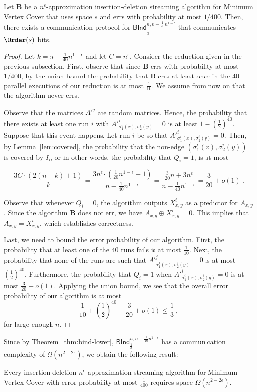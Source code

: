 \begin{theorem} \label{thm:vc-reduction}
 Let $\mathbf{B}$ be a $n^{\epsilon}$-approximation 
 insertion-deletion streaming algorithm for \textsf{Minimum Vertex Cover} that uses space $s$ and errs with probability 
 at most $1/400$. Then, there exists a communication protocol for $\textsf{BInd}^{n,n - \frac{1}{20}n^{1-\epsilon}}_{\frac{1}{3}}$ 
 that communicates $\Order(s)$ bits.
\end{theorem}
\begin{proof}
Let $k = n - \frac{1}{40} n^{1-\epsilon}$ and let $C= n^{\epsilon}$.
 Consider the reduction given in the previous subsection. First, observe that since $\mathbf{B}$ errs with probability
 at most $1/400$, by the union bound the probability that $\mathbf{B}$ errs at least once in the $40$ parallel executions of our
 reduction is at most $\frac{1}{10}$. We assume from now on that the algorithm never errs.
 
 Observe that the matrices $A'^j$ are random matrices. Hence, 
%
%
 the probability that there exists at least one run $i$ with $A'^i_{\sigma^i_1(x), \sigma^i_2(y)} = 0$ is at least 
 $1 - (\frac{1}{2})^{40}$. Suppose that this event happens. Let run $i$ be so that $A'^i_{\sigma^i_1(x), \sigma^i_2(y)} = 0$.
 Then, by Lemma~\ref{lem:covered}, the probability that the non-edge $(\sigma^i_1(x), \sigma^i_2(y))$ is covered by $I_i$,
 or in other words, the probability that $Q_i = 1$, is at most 
 
 $$\frac{3 C \cdot (2(n-k) + 1)}{k} = \frac{3n^{\epsilon} \cdot (\frac{1}{20} n^{1-\epsilon} + 1) }{n - \frac{1}{40}n^{1-\epsilon}} = 
 \frac{\frac{3}{20}n + 3n^{\epsilon}}{n - \frac{1}{40}n^{1-\epsilon}} = \frac{3}{20} + o(1) \ . $$  
 
 Observe that whenever $Q_i = 0$, the algorithm outputs $X^i_{x,y}$ as a predictor for $A_{x,y}$. Since the algorithm $\mathbf{B}$ 
 does not err, we have $A_{x,y} \oplus X^i_{x,y} = 0$. This implies that $A_{x,y} = X^i_{x,y}$, which establishes correctness.
 
 Last, we need to bound the error probability of our algorithm. First, the probability that at least one of the $40$ runs 
 fails is at most $\frac{1}{10}$. Next, the probability that none of the runs are such that $A'^j_{\sigma^j_1(x), \sigma^j_2(y)} = 0$
 is at most $(\frac{1}{2})^{40}$. Furthermore, the probability that $Q_i = 1$ when $A'^i_{\sigma^i_1(x), \sigma^i_2(y)} = 0$ is at 
 most $\frac{3}{20} + o(1)$. Applying the union bound, we see that the overall error probability of our algorithm is at most
 $$\frac{1}{10}+ (\frac{1}{2})^{40} + \frac{3}{20} + o(1) \le \frac{1}{3} \ , $$
 for large enough $n$. 
\end{proof}
Since by Theorem~\ref{thm:bind-lower}, $\textsf{BInd}^{n,n - \frac{1}{40}n^{1-\epsilon}}_{\frac{1}{3}}$ has a 
communication complexity of $\Omega(n^{2-2\epsilon})$, we
obtain the following result:
\begin{corollary}
 Every insertion-deletion $n^\epsilon$-approximation streaming algorithm for \textsf{Minimum Vertex Cover} with error probability 
 at most $\frac{1}{400}$ requires space $\Omega(n^{2-2\epsilon})$.
\end{corollary}
